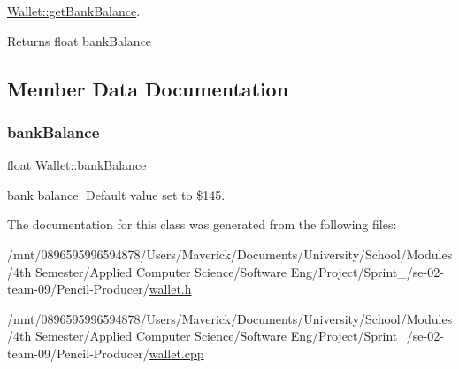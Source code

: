 \hyperlink{classWallet_a92536035a1de76dc7842693beb93cd24}{Wallet\+::get\+Bank\+Balance}. 

\begin{DoxyReturn}{Returns}
float bank\+Balance 
\end{DoxyReturn}


\subsection{Member Data Documentation}
\mbox{\label{classWallet_a586fc4e3fb0e9ce59e5bbafd9145d319}} 
\subsubsection{\texorpdfstring{bank\+Balance}{bankBalance}}
{\footnotesize\ttfamily float Wallet\+::bank\+Balance\hspace{0.3cm}{\ttfamily [private]}}



bank balance. Default value set to \$145. 



The documentation for this class was generated from the following files\+:\begin{DoxyCompactItemize}
\item 
/mnt/0896595996594878/\+Users/\+Maverick/\+Documents/\+University/\+School/\+Modules/4th Semester/\+Applied Computer Science/\+Software Eng/\+Project/\+Sprint\+\_/se-\/02-\/team-\/09/\+Pencil-\/\+Producer/\hyperlink{wallet_8h}{wallet.\+h}\item 
/mnt/0896595996594878/\+Users/\+Maverick/\+Documents/\+University/\+School/\+Modules/4th Semester/\+Applied Computer Science/\+Software Eng/\+Project/\+Sprint\+\_/se-\/02-\/team-\/09/\+Pencil-\/\+Producer/\hyperlink{wallet_8cpp}{wallet.\+cpp}\end{DoxyCompactItemize}
